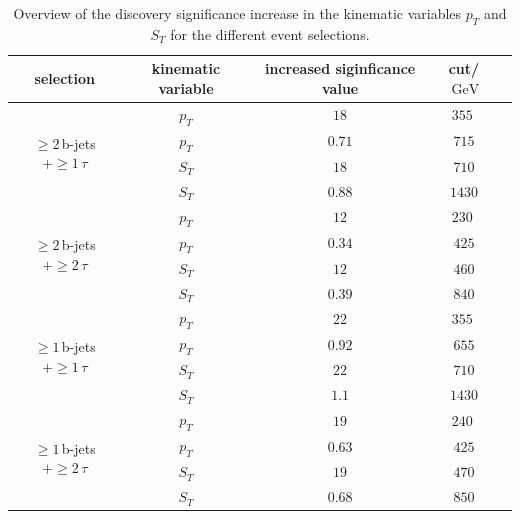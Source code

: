 	\begin{table}[htbp]
		\centering
                \footnotesize
                \renewcommand{\arraystretch}{1.2}
		\begin{tabular*}{\linewidth}{@{\extracolsep{\fill}}ccccc}
		\hline
		\hline
		\textbf{selection}  & \textbf{kinematic variable}  & \textbf{increased siginficance value}      & \textbf{cut}/$\SI{}{\giga\electronvolt}$ 
		\\
		\hline
		\multirow{4}{*}{$\geq 2\,$b-jets $+\geq 1\,\tau$} & $p_T$      & $18$      & $\SI{355}{}$
		\\
                &       $p_T$   & $0.71$        & $715$
                \\
                &       $S_T$   & $18$        & $710$
                \\
                &       $S_T$   & $0.88$        & $1430$
                \\
		\hline
		\multirow{4}{*}{$\geq 2\,$b-jets $+\geq 2\,\tau$} & $p_T$      & $12$      & $\SI{230}{}$
		\\
                &       $p_T$   & $0.34$        & $425$
                \\
                &       $S_T$   & $12$        & $460$
                \\
                &       $S_T$   & $0.39$        & $840$
                \\
		\hline
                \multirow{4}{*}{$\geq 1\,$b-jets $+\geq 1\,\tau$} & $p_T$      & $22$      & $\SI{355}{}$
		\\
                &       $p_T$   & $0.92$        & $655$
                \\
                &       $S_T$   & $22$        & $710$
                \\
                &       $S_T$   & $1.1$        & $1430$
                \\
		\hline
                \multirow{4}{*}{$\geq 1\,$b-jets $+\geq 2\,\tau$} & $p_T$      & $19$      & $\SI{240}{}$
		\\
                &       $p_T$   & $0.63$        & $425$
                \\
                &       $S_T$   & $19$        & $470$
                \\
                &       $S_T$   & $0.68$        & $850$
                \\
                \hline
		\hline
		\end{tabular*}
		\caption[Overview of the discovery significance increase in the kinematic variables $p_T$ and $S_T$ for the different event selections.]{Overview of the discovery significance increase in the kinematic variables $p_T$ and $S_T$ for the different event selections. }
		\label{xcuts}
                \renewcommand{\arraystretch}{1}
                \end{table}
